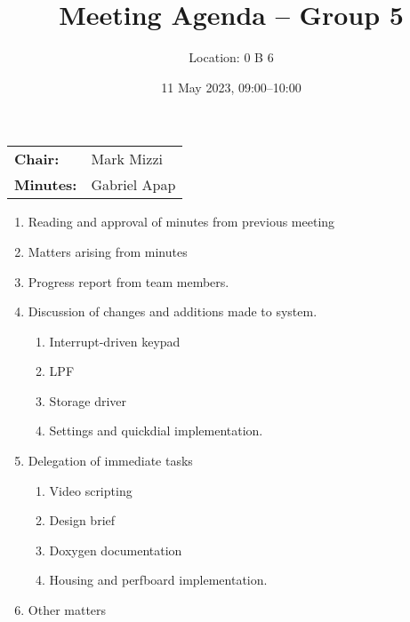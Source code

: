 \documentclass[11pt,a4paper]{scrartcl}
\title{Meeting Agenda -- Group 5}
\author{Location: 0 B 6}
\date{11 May 2023, 09:00--10:00}
\begin{document}
\maketitle
\begin{center}
\begin{tabular}{ll}
\textbf{Chair:}   & Mark Mizzi \\
\textbf{Minutes:} & Gabriel Apap\\
\end{tabular}
\end{center}

\begin{enumerate}

\item Reading and approval of minutes from previous meeting

\item Matters arising from minutes

\item Progress report from team members.

\item Discussion of changes and additions made to system.
    \begin{enumerate}
        \item Interrupt-driven keypad
        \item LPF
        \item Storage driver
        \item Settings and quickdial implementation.
    \end{enumerate}

\item Delegation of immediate tasks
    \begin{enumerate}
        \item Video scripting
        \item Design brief
        \item Doxygen documentation
        \item Housing and perfboard implementation.
    \end{enumerate}

\item Other matters

\end{enumerate}
\end{document}
